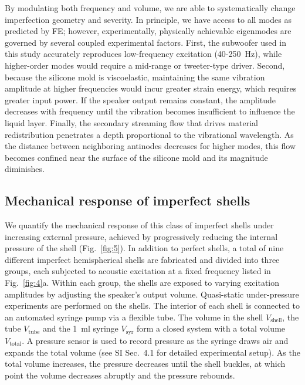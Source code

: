 \documentclass[twocolumn,letter,11pt]{article}
\begin{document}
By modulating both frequency and volume, we are able to systematically change imperfection geometry and severity. In principle, we have access to all modes as predicted by FE; however, experimentally, physically achievable eigenmodes are governed by several coupled experimental factors. First, the subwoofer used in this study accurately reproduces low-frequency excitation (\num{40}-\SI{250}{\hertz}), while higher-order modes would require a mid-range or tweeter-type driver. Second, because the silicone mold is viscoelastic, maintaining the same vibration amplitude at higher frequencies would incur greater strain energy, which requires greater input power. If the speaker output remains constant, the amplitude decreases with frequency until the vibration becomes insufficient to influence the liquid layer. Finally, the secondary streaming flow that drives material redistribution penetrates a depth proportional to the vibrational wavelength. As the distance between neighboring antinodes decreases for higher modes, this flow becomes confined near the surface of the silicone mold and its magnitude diminishes.

\subsection*{Mechanical response of imperfect shells}
We quantify the mechanical response of this class of imperfect shells under increasing external pressure, achieved by progressively reducing the internal pressure of the shell (Fig.~\ref{fig:5}).
In addition to perfect shells, a total of nine different imperfect hemispherical shells are fabricated and divided into three groups, each subjected to acoustic excitation at a fixed frequency listed in Fig.~\ref{fig:4}a. Within each group, the shells are exposed to varying excitation amplitudes by adjusting the speaker's output volume. Quasi-static under-pressure experiments are performed on the shells. The interior of each shell is connected to an automated syringe pump via a flexible tube. The volume in the shell $V_\mathrm{shell}$, the tube $V_\mathrm{tube}$ and the \SI{1}{\milli\litre} syringe $V_\mathrm{syr}$ form a closed system with a total volume $V_\mathrm{total}$. A pressure sensor is used to record pressure as the syringe draws air and expands the total volume (see SI Sec.~4.1 for detailed experimental setup). As the total volume increases, the pressure decreases until the shell buckles, at which point the volume decreases abruptly and the pressure rebounds.
\end{document}
